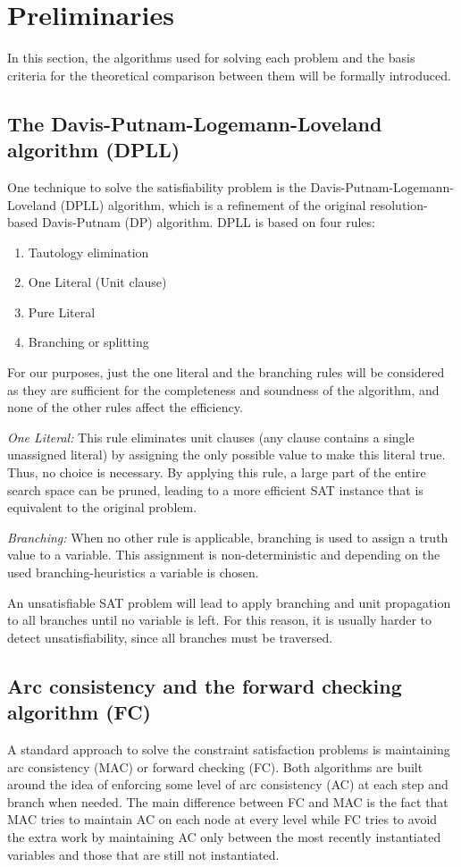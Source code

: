 \section{Preliminaries}\label{sec:prelim}
In this section, the algorithms used for solving each problem and the basis criteria for the theoretical comparison between them will be formally introduced. 

\subsection{The Davis-Putnam-Logemann-Loveland algorithm (DPLL)}
One technique to solve the satisfiability problem is the Davis-Putnam-Logemann-Loveland (DPLL) algorithm, which is a refinement of the original resolution-based Davis-Putnam (DP) algorithm. DPLL is based on four rules:
\begin{enumerate}
	\item Tautology elimination
	\item One Literal (Unit clause)
	\item Pure Literal
	\item Branching or splitting
\end{enumerate}
For our purposes, just the one literal and the branching rules will be considered as they are sufficient for the completeness and soundness of the algorithm, and none of the other rules affect the efficiency.

\textit{One Literal:} This rule eliminates unit clauses (any clause contains a single unassigned literal) by assigning the only possible value to make this literal true. Thus, no choice is necessary. By applying this rule, a large part of the entire search space can be pruned, leading to a more efficient SAT instance that is equivalent to the original problem.

\textit{Branching:} When no other rule is applicable, branching is used to assign a truth value to a variable. This assignment is non-deterministic and depending on the used branching-heuristics a variable is chosen. 

An unsatisfiable SAT problem will lead to apply branching and unit propagation to all branches until no variable is left. For this reason, it is usually harder to detect unsatisfiability, since all branches must be traversed.

\subsection{Arc consistency and the forward checking algorithm (FC)}
A standard approach to solve the constraint satisfaction problems is maintaining arc consistency (MAC) or forward checking (FC). Both algorithms are built around the idea of enforcing some level of arc consistency (AC) at each step and branch when needed. The main difference between FC and MAC is the fact that MAC tries to maintain AC on each node at every level while FC tries to avoid the extra work by maintaining AC only between the most recently instantiated variables and those that are still not instantiated.

